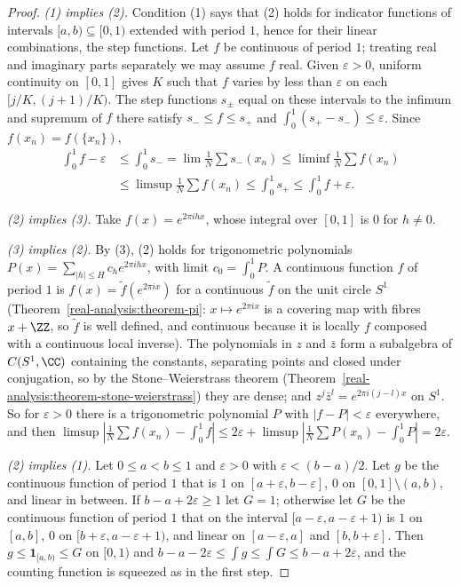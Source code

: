 \begin{proof}
\emph{(1) implies (2).} Condition (1) says that (2) holds for indicator functions of intervals $[a, b) \subseteq [0, 1)$ extended with period $1$, hence for their linear combinations, the step functions.
Let $f$ be continuous of period $1$; treating real and imaginary parts separately we may assume $f$ real. Given $\varepsilon > 0$, uniform continuity on $[0, 1]$ gives $K$ such that $f$ varies by less
than $\varepsilon$ on each $[j/K, (j + 1)/K)$. The step functions $s_\pm$ equal on these intervals to the infimum and supremum of $f$ there satisfy $s_- \leq f \leq s_+$ and
$\int_0^1(s_+ - s_-) \leq \varepsilon$. Since $f(x_n) = f(\{x_n\})$,
\[
\begin{aligned}
\int_0^1f - \varepsilon &\leq \int_0^1s_- = \lim\frac1N\sum s_-(x_n) \leq \liminf\frac1N\sum f(x_n)\\
&\leq \limsup\frac1N\sum f(x_n) \leq \int_0^1s_+ \leq \int_0^1f + \varepsilon.
\end{aligned}
\]

\emph{(2) implies (3).} Take $f(x) = e^{2\pi ihx}$, whose integral over $[0, 1]$ is $0$ for $h \neq 0$.

\emph{(3) implies (2).} By (3), (2) holds for trigonometric polynomials $P(x) = \sum_{|h| \leq H}c_he^{2\pi ihx}$, with limit $c_0 = \int_0^1P$. A continuous function $f$ of period $1$ is
$f(x) = \tilde{f}(e^{2\pi ix})$ for a continuous $\tilde{f}$ on the unit circle $S^1$ (Theorem~\ref{real-analysis:theorem-pi}: $x \mapsto e^{2\pi ix}$ is a covering map with fibres $x + \ZZ$, so
$\tilde{f}$ is well defined, and continuous because it is locally $f$ composed with a continuous local inverse). The polynomials in $z$ and $\bar{z}$ form a subalgebra of $C(S^1, \CC)$ containing the
constants, separating points and closed under conjugation, so by the Stone--Weierstrass theorem (Theorem~\ref{real-analysis:theorem-stone-weierstrass}) they are dense; and
$z^j\bar{z}^l = e^{2\pi i(j - l)x}$ on $S^1$. So for $\varepsilon > 0$ there is a trigonometric polynomial $P$ with $|f - P| < \varepsilon$ everywhere, and then
$\limsup|\frac1N\sum f(x_n) - \int_0^1f| \leq 2\varepsilon + \limsup|\frac1N\sum P(x_n) - \int_0^1P| = 2\varepsilon$.

\emph{(2) implies (1).} Let $0 \leq a < b \leq 1$ and $\varepsilon > 0$ with $\varepsilon < (b - a)/2$. Let $g$ be the continuous function of period $1$ that is $1$ on $[a + \varepsilon, b - \varepsilon]$, $0$
on $[0, 1] \setminus (a, b)$, and linear in between. If $b - a + 2\varepsilon \geq 1$ let $G = 1$; otherwise let $G$ be the continuous function of period $1$ that on the interval
$[a - \varepsilon, a - \varepsilon + 1)$ is $1$ on $[a, b]$, $0$ on $[b + \varepsilon, a - \varepsilon + 1)$, and linear on $[a - \varepsilon, a]$ and $[b, b + \varepsilon]$. Then $g \leq \mathbf{1}_{[a, b)} \leq G$ on $[0, 1)$ and
$b - a - 2\varepsilon \leq \int g \leq \int G \leq b - a + 2\varepsilon$, and the counting function is squeezed as in the first step.
\end{proof}

